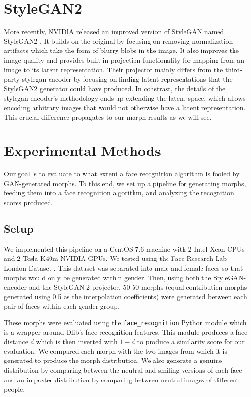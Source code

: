 \documentclass[12pt]{article}
\begin{document}
\section{StyleGAN2}
\par
More recently, NVIDIA released an improved version of StyleGAN named StyleGAN2 \cite{stylegan2}. It builds on the original by focusing on removing normalization artifacts which take the form of blurry blobs in the image. It also improves the image quality and provides built in projection functionality for mapping from an image to its latent representation. Their projector mainly differs from the third-party stylegan-encoder by focusing on finding latent representations that the StyleGAN2 generator could have produced. In constrast, the details of the stylegan-encoder's methodology ends up extending the latent space, which allows encoding arbitrary images that would not otherwise have a latent representation. This crucial difference propagates to our morph results as we will see.

\section{Experimental Methods}
\par
Our goal is to evaluate to what extent a face recognition algorithm is fooled by GAN-generated morphs. To this end, we set up a pipeline for generating morphs, feeding them into a face recognition algorithm, and analyzing the recognition scores produced.

\subsection{Setup}
\par
We implemented this pipeline on a CentOS 7.6 machine with 2 Intel Xeon CPUs and 2 Tesla K40m NVIDIA GPUs. We tested using the Face Research Lab London Dataset \cite{london}. This dataset was separated into male and female faces so that morphs would only be generated within gender. Then, using both the StyleGAN-encoder and the StyleGAN 2 projector, 50-50 morphs (equal contribution morphs generated using 0.5 as the interpolation coefficients) were generated between each pair of faces within each gender group.
\par
These morphs were evaluated using the \texttt{face\_recognition} Python module which is a wrapper around Dlib's face recognition features. This module produces a face distance $d$ which is then inverted with $1-d$ to produce a similarity score for our evaluation. We compared each morph with the two images from which it is generated to produce the morph distribution. We also generate a genuine distribution by comparing between the neutral and smiling versions of each face and an imposter distribution by comparing between neutral images of different people.
\end{document}

